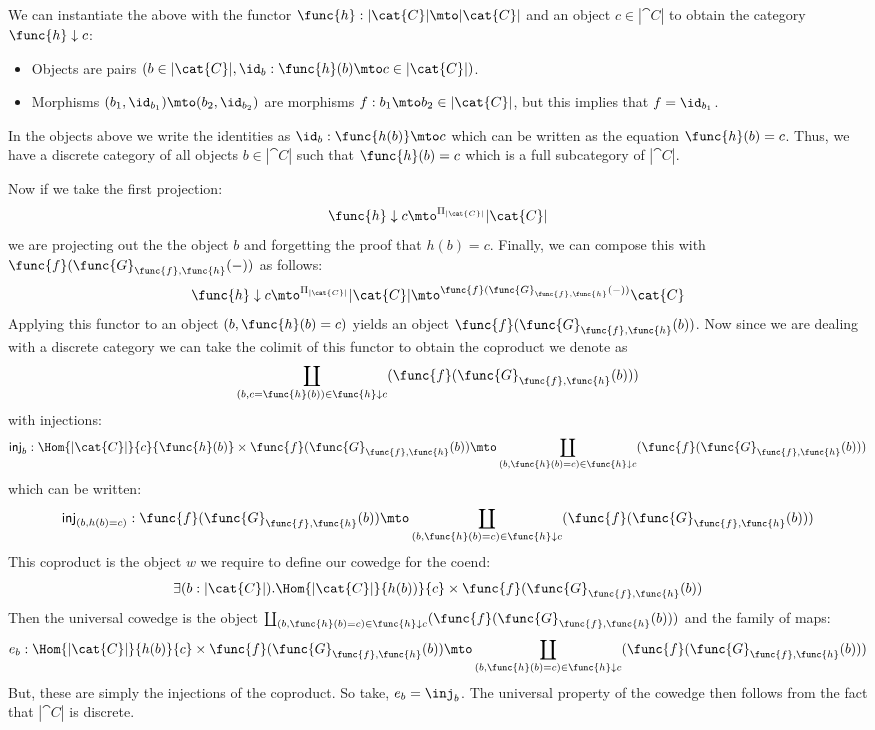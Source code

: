 \noindent
We can instantiate the above with the functor $\func{h} : |\cat{C}|
\mto |\cat{C}|$ and an object $c \in |\cat{C}|$ to obtain the
category $\func{h} \downarrow c$:
\begin{itemize}
\item Objects are pairs $(b \in |\cat{C}|, \id_{b} : \func{h}(b)
\mto c \in |\cat{C}|)$.

\item Morphisms $(b_1,\id_{b_1}) \mto (b_2,\id_{b_2})$ are morphisms
$f : b_1 \mto b_2 \in |\cat{C}|$, but this implies that $f = \id_{b_1}$.
\end{itemize}
In the objects above we write the identities as $\id_{b} :
\func{h(b)} \mto c$ which can be written as the equation
$\func{h}(b) = c$. Thus, we have a discrete category of all objects $b
\in |\cat{C}|$ such that $\func{h}(b) = c$ which is a full subcategory
of $|\cat{C}|$.

Now if we take the first projection:
\[
    \func{h} \downarrow c \mto^{\Pi_{|\cat{C}|}} |\cat{C}|
\]
we are projecting out the the object $b$ and forgetting the proof
that $h(b) = c$.  Finally, we can compose this with
$\func{f}(\func{G}_{\func{f},\func{h}}(-))$ as follows:
\[
    \func{h} \downarrow c \mto^{\Pi_{|\cat{C}|}} |\cat{C}| \mto^{\func{f}(\func{G}_{\func{f},\func{h}}(-))} \cat{C}
\]
Applying this functor to an object $(b, \func{h}(b) = c)$ yields an
object $\func{f}(\func{G}_{\func{f},\func{h}}(b))$.  Now since we are
dealing with a discrete category we can take the colimit of this
functor to obtain the coproduct we denote as 
\[
   \coprod_{(b,c = \func{h}(b)) \in \func{h} \downarrow c}(\func{f}(\func{G}_{\func{f},\func{h}}(b)))
\]
with injections:
\[
    \mathsf{inj}_b : \Hom{|\cat{C}|}{c}{\func{h}(b)} \times \func{f}(\func{G}_{\func{f},\func{h}}(b)) \mto \coprod_{(b,\func{h}(b) = c) \in \func{h} \downarrow c}(\func{f}(\func{G}_{\func{f},\func{h}}(b)))
\]
which can be written:
\[
    \mathsf{inj}_{(b,h(b) = c)} : \func{f}(\func{G}_{\func{f},\func{h}}(b)) \mto \coprod_{(b,\func{h}(b) = c) \in \func{h} \downarrow c}(\func{f}(\func{G}_{\func{f},\func{h}}(b)))
\]
This coproduct is the object $w$ we require to define our cowedge for
the coend:
\[
    \exists(b : |\cat{C}|).\Hom{|\cat{C}|}{h(b))}{c} \times \func{f}(\func{G}_{\func{f},\func{h}}(b))
\]
Then the universal cowedge is the object $\coprod_{(b,\func{h}(b) = c)
\in \func{h} \downarrow c}(\func{f}(\func{G}_{\func{f},\func{h}}(b)))$
and the family of maps:
\[
    e_b : \Hom{|\cat{C}|}{h(b)}{c} \times \func{f}(\func{G}_{\func{f},\func{h}}(b)) \mto 
    \coprod_{(b,\func{h}(b) = c) \in \func{h} \downarrow c}(\func{f}(\func{G}_{\func{f},\func{h}}(b)))
\]
But, these are simply the injections of the coproduct.  So take, $e_b
= \inj_{b}$.  The universal property of the cowedge then follows from
the fact that $|\cat{C}|$ is discrete. 

